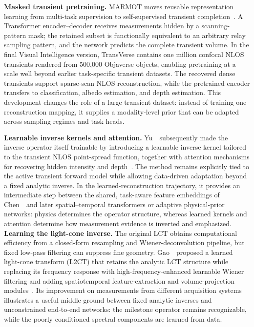 \vspace{0.8mm}
\noindent \textbf{Masked transient pretraining.}
MARMOT moves reusable representation learning from multi-task supervision to self-supervised transient completion~\cite{shen2026marmot}. A Transformer encoder--decoder receives measurements hidden by a scanning-pattern mask; the retained subset is functionally equivalent to an arbitrary relay sampling pattern, and the network predicts the complete transient volume. In the final Visual Intelligence version, TransVerse contains one million confocal NLOS transients rendered from 500,000 Objaverse objects, enabling pretraining at a scale well beyond earlier task-specific transient datasets. The recovered dense transients support sparse-scan NLOS reconstruction, while the pretrained encoder transfers to classification, albedo estimation, and depth estimation. This development changes the role of a large transient dataset: instead of training one reconstruction mapping, it supplies a modality-level prior that can be adapted across sampling regimes and task heads.

\vspace{0.8mm}
\noindent \textbf{Learnable inverse kernels and attention.}
Yu~\etal~subsequently made the inverse operator itself trainable by introducing a learnable inverse kernel tailored to the transient NLOS point-spread function, together with attention mechanisms for recovering hidden intensity and depth~\cite{yuLearnableInverseKernel2023}. The method remains explicitly tied to the active transient forward model while allowing data-driven adaptation beyond a fixed analytic inverse. In the learned-reconstruction trajectory, it provides an intermediate step between the shared, task-aware feature embeddings of Chen~\etal~and later spatial--temporal transformers or adaptive physical-prior networks: physics determines the operator structure, whereas learned kernels and attention determine how measurement evidence is inverted and emphasized.
\vspace{0.8mm}
\noindent \textbf{Learning the light-cone inverse.}
The original LCT obtains computational efficiency from a closed-form resampling and Wiener-deconvolution pipeline, but fixed low-pass filtering can suppress fine geometry. Gao~\etal~proposed a learned light-cone transform (L2CT) that retains the analytic LCT structure while replacing its frequency response with high-frequency-enhanced learnable Wiener filtering and adding spatiotemporal feature-extraction and volume-projection modules~\cite{gaoLearnedLCT2026}. Its improvement on measurements from different acquisition systems illustrates a useful middle ground between fixed analytic inverses and unconstrained end-to-end networks: the milestone operator remains recognizable, while the poorly conditioned spectral components are learned from data.

